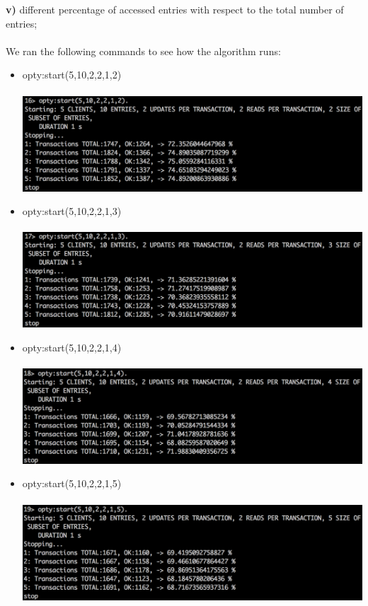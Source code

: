 \documentclass[a4paper, 11pt]{article}
\begin{document}
\textbf{v)} different percentage of accessed entries with respect to the total number of entries;\\\\

We ran the following commands to see how the algorithm runs:\\

\begin{itemize}
\item opty:start(5,10,2,2,1,2)\\\\
\includegraphics[scale=0.5]{images/exp-v-1.png} \\
\item opty:start(5,10,2,2,1,3)\\\\
\includegraphics[scale=0.5]{images/exp-v-2.png} \\
\item opty:start(5,10,2,2,1,4)\\\\
\includegraphics[scale=0.5]{images/exp-v-3.png} \\
\item opty:start(5,10,2,2,1,5)\\\\
\includegraphics[scale=0.5]{images/exp-v-4.png} \\

\end{itemize}
\end{document}
